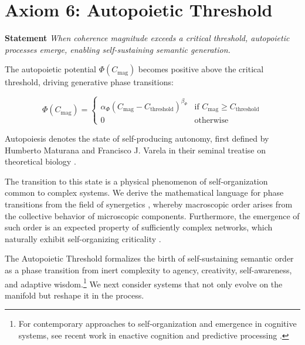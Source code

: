 
\section{Axiom 6: Autopoietic Threshold}
\label{1.6:axiom_6_autopoietic_threshold}

\textbf{Statement} \textit{When coherence magnitude exceeds a critical threshold, autopoietic processes emerge, enabling self-sustaining semantic generation.}

The autopoietic potential \(\Phi(C_{\text{mag}})\) becomes positive above the critical threshold, driving generative phase transitions:

\begin{equation}
\Phi(C_{\text{mag}}) = \begin{cases}
\alpha_{\Phi} (C_{\text{mag}} - C_{\text{threshold}})^{\beta_{\Phi}} & \text{if } C_{\text{mag}} \geq C_{\text{threshold}} \\
0 & \text{otherwise}
\end{cases}
\end{equation}

Autopoiesis denotes the state of self-producing autonomy, first defined by Humberto Maturana and Francisco J. Varela in their seminal treatise on theoretical biology \autocite{MaturanaVarela1980}.

The transition to this state is a physical phenomenon of self-organization common to complex systems. We derive the mathematical language for phase transitions from the field of synergetics \autocite{Haken1983}, whereby macroscopic order arises from the collective behavior of microscopic components. Furthermore, the emergence of such order is an expected property of sufficiently complex networks, which naturally exhibit self-organizing criticality \autocite{BakTangWiesenfeld1987}.

The Autopoietic Threshold formalizes the birth of self-sustaining semantic order as a phase transition from inert complexity to agency, creativity, self-awareness, and adaptive wisdom.\footnote{For contemporary approaches to self-organization and emergence in cognitive systems, see recent work in enactive cognition \autocite{Thompson2018, DiPaolo2021} and predictive processing \autocite{Clark2016, Hohwy2013}.} We next consider systems that not only evolve on the manifold but reshape it in the process.



